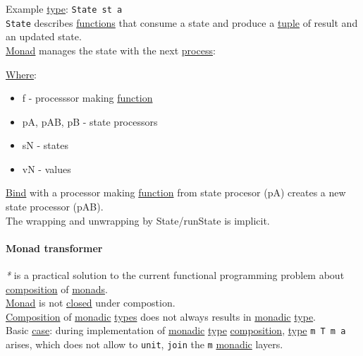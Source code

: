 \documentclass[a4paper,14pt,oneside]{book}
\begin{document}
Example \hyperref[org33d7e2e]{type}: \texttt{State st a}\\

\texttt{State} describes \hyperref[org0da3116]{functions} that consume a state and produce a \hyperref[orgd503c32]{tuple} of result and an updated state.\\

\hyperref[org27993ff]{Monad} manages the state with the next \hyperref[org24c34d9]{process}:\\

\begin{center}

\end{center}

\hyperref[org4d13465]{Where}:\\
\begin{itemize}
\item f  - processsor making \hyperref[org25ee224]{function}\\
\item pA, pAB, pB - state processors\\
\item sN - states\\
\item vN - values\\
\end{itemize}
\hyperref[org624c8a5]{Bind} with a processor making \hyperref[org25ee224]{function} from state procesor (pA) creates a new state processor (pAB).\\
The wrapping and unwrapping by State/runState is implicit.\\

\paragraph{\label{org9029a57}Monad transformer}
\label{sec:orga974166}
\emph{*} is a practical solution to the current functional programming problem about \hyperref[orgdb1d873]{composition} of \hyperref[orgb4d8700]{monads}.\\

\hyperref[org27993ff]{Monad} is not \hyperref[orgd70beb6]{closed} under compostion.\\
\hyperref[orgdb1d873]{Composition} of \hyperref[org6161b39]{monadic} \hyperref[org120e41a]{types} does not always results in \hyperref[org6161b39]{monadic} \hyperref[org33d7e2e]{type}.\\

Basic \hyperref[org30ed04b]{case}: during implementation of \hyperref[org6161b39]{monadic} \hyperref[org33d7e2e]{type} \hyperref[orgdb1d873]{composition}, \hyperref[org33d7e2e]{type} \texttt{m T m a} arises, which does not allow to \texttt{unit}, \texttt{join} the \texttt{m} \hyperref[org6161b39]{monadic} layers.\\
\end{document}
